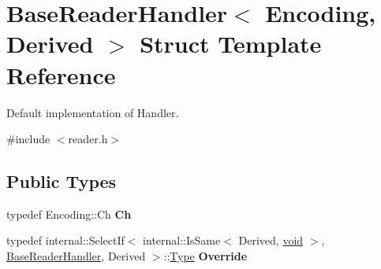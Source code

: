 \hypertarget{struct_base_reader_handler}{}\section{Base\+Reader\+Handler$<$ Encoding, Derived $>$ Struct Template Reference}
\label{struct_base_reader_handler}


Default implementation of Handler.  




{\ttfamily \#include $<$reader.\+h$>$}

\subsection*{Public Types}
\begin{DoxyCompactItemize}
\item 
\hypertarget{struct_base_reader_handler_a8302c755dd3560c8c5bac99162c28214}{}typedef Encoding\+::\+Ch {\bfseries Ch}\label{struct_base_reader_handler_a8302c755dd3560c8c5bac99162c28214}

\item 
\hypertarget{struct_base_reader_handler_a7b6c70d9bf7483b2de5d249f1593776a}{}typedef internal\+::\+Select\+If$<$ internal\+::\+Is\+Same$<$ Derived, \hyperlink{_s_d_l__audio_8h_a52835ae37c4bb905b903cbaf5d04b05f}{void} $>$, \hyperlink{struct_base_reader_handler}{Base\+Reader\+Handler}, Derived $>$\+::\hyperlink{rapidjson_8h_a1d1cfd8ffb84e947f82999c682b666a7}{Type} {\bfseries Override}\label{struct_base_reader_handler_a7b6c70d9bf7483b2de5d249f1593776a}

\end{DoxyCompactItemize}
